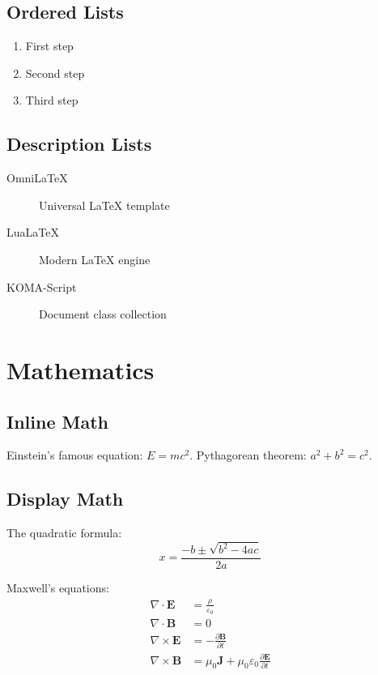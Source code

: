 \documentclass[
    language=english,
    doctype=book,              %
    institution=none,        %
    oneside,                 %
    loadGlossaries,          %
]{../../omnilatex}
\begin{document}
\section{Ordered Lists}

\begin{enumerate}
	\item First step
	\item Second step
	\item Third step
\end{enumerate}

\section{Description Lists}

\begin{description}
	\item[OmniLaTeX] Universal LaTeX template
	\item[LuaLaTeX] Modern LaTeX engine
	\item[KOMA-Script] Document class collection
\end{description}

\chapter{Mathematics}

\section{Inline Math}

Einstein's famous equation: $E = mc^2$.
Pythagorean theorem: $a^2 + b^2 = c^2$.

\section{Display Math}

The quadratic formula:
\begin{equation}
	x = \frac{-b \pm \sqrt{b^2 - 4ac}}{2a}
	\label{eq:quadratic}
\end{equation}

Maxwell's equations:
\begin{align}
	\nabla \cdot \mathbf{E}  & = \frac{\rho}{\varepsilon_0}                                                   \\
	\nabla \cdot \mathbf{B}  & = 0                                                                            \\
	\nabla \times \mathbf{E} & = -\frac{\partial \mathbf{B}}{\partial t}                                      \\
	\nabla \times \mathbf{B} & = \mu_0 \mathbf{J} + \mu_0\varepsilon_0 \frac{\partial \mathbf{E}}{\partial t}
\end{align}
\end{document}
